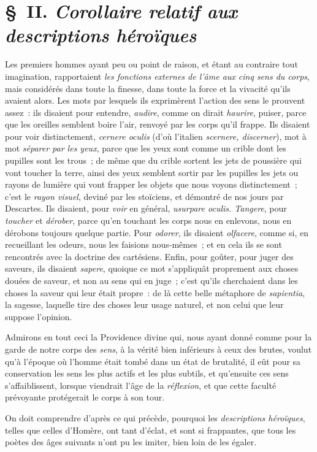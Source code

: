 \documentclass[french,twoside]{book} %
\begin{document}
\section[{§ II. Corollaire relatif aux descriptions héroïques}]{§ II. {\itshape Corollaire relatif aux descriptions héroïques}}
\noindent  Les premiers hommes ayant peu ou point de raison, et étant au contraire tout imagination, rapportaient {\itshape les fonctions externes de l’âme aux cinq sens du corps}, mais considérés dans toute la finesse, dans toute la force et la vivacité qu’ils avaient alors. Les mots par lesquels ils exprimèrent l’action des sens le prouvent assez : ils disaient pour entendre, {\itshape audire}, comme on dirait {\itshape haurire}, puiser, parce que les oreilles semblent boire l’air, renvoyé par les corps qu’il frappe. Ils disaient pour voir distinctement, {\itshape cernere oculis} (d’où l’italien {\itshape scernere, discerner}), mot à mot {\itshape séparer par les yeux}, parce que les yeux sont comme un crible dont les pupilles sont les trous ; de même que du crible sortent les jets de poussière qui vont toucher la terre, ainsi des yeux semblent sortir par les pupilles les jets ou rayons de lumière qui vont frapper les objets que nous voyons distinctement ; c’est le {\itshape rayon visuel}, deviné par les stoïciens, et démontré de nos jours par Descartes. Ils disaient, pour {\itshape voir} en général, {\itshape usurpare oculis. Tangere}, pour {\itshape toucher} et {\itshape dérober}, parce qu’en touchant les corps nous en enlevons, nous en dérobons toujours quelque partie. Pour {\itshape odorer}, ils disaient {\itshape olfacere}, comme si, en recueillant les odeurs, nous les faisions nous-mêmes ;  et en cela ils se sont rencontrés avec la doctrine des cartésiens. Enfin, pour goûter, pour juger des saveurs, ils disaient {\itshape sapere}, quoique ce mot s’appliquât proprement aux choses douées de saveur, et non au sens qui en juge ; c’est qu’ils cherchaient dans les choses la saveur qui leur était propre : de là cette belle métaphore de {\itshape sapientia}, la sagesse, laquelle tire des choses leur usage naturel, et non celui que leur suppose l’opinion.\par
Admirons en tout ceci la Providence divine qui, nous ayant donné comme pour la garde de notre corps des {\itshape sens}, à la vérité bien inférieurs à ceux des brutes, voulut qu’à l’époque où l’homme était tombé dans un état de brutalité, il eût pour sa conservation les sens les plus actifs et les plus subtils, et qu’ensuite ces sens s’affaiblissent, lorsque viendrait l’âge de la {\itshape réflexion}, et que cette faculté prévoyante protégerait le corps à son tour.\par
On doit comprendre d’après ce qui précède, pourquoi les {\itshape descriptions héroïques}, telles que celles d’Homère, ont tant d’éclat, et sont si frappantes, que tous les poètes des âges suivants n’ont pu les imiter, bien loin de les égaler.
\end{document}
